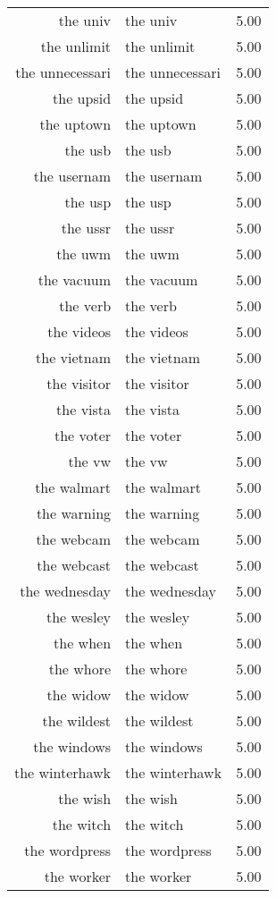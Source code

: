 \begin{table}[ht]
\begin{tabular}{rlr}
  the univ & the univ & 5.00 \\ 
  the unlimit & the unlimit & 5.00 \\ 
  the unnecessari & the unnecessari & 5.00 \\ 
  the upsid & the upsid & 5.00 \\ 
  the uptown & the uptown & 5.00 \\ 
  the usb & the usb & 5.00 \\ 
  the usernam & the usernam & 5.00 \\ 
  the usp & the usp & 5.00 \\ 
  the ussr & the ussr & 5.00 \\ 
  the uwm & the uwm & 5.00 \\ 
  the vacuum & the vacuum & 5.00 \\ 
  the verb & the verb & 5.00 \\ 
  the videos & the videos & 5.00 \\ 
  the vietnam & the vietnam & 5.00 \\ 
  the visitor & the visitor & 5.00 \\ 
  the vista & the vista & 5.00 \\ 
  the voter & the voter & 5.00 \\ 
  the vw & the vw & 5.00 \\ 
  the walmart & the walmart & 5.00 \\ 
  the warning & the warning & 5.00 \\ 
  the webcam & the webcam & 5.00 \\ 
  the webcast & the webcast & 5.00 \\ 
  the wednesday & the wednesday & 5.00 \\ 
  the wesley & the wesley & 5.00 \\ 
  the when & the when & 5.00 \\ 
  the whore & the whore & 5.00 \\ 
  the widow & the widow & 5.00 \\ 
  the wildest & the wildest & 5.00 \\ 
  the windows & the windows & 5.00 \\ 
  the winterhawk & the winterhawk & 5.00 \\ 
  the wish & the wish & 5.00 \\ 
  the witch & the witch & 5.00 \\ 
  the wordpress & the wordpress & 5.00 \\ 
  the worker & the worker & 5.00 \\ 

\end{tabular}
\end{table}
